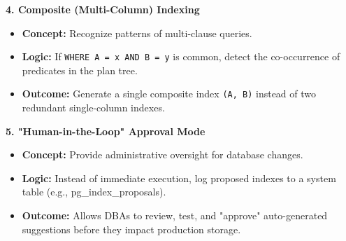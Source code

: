 \documentclass[12pt]{article}
\begin{document}
\noindent\textbf{4. Composite (Multi-Column) Indexing}

\begin{itemize}
    \item \textbf{Concept:} Recognize patterns of multi-clause queries.

    \item \textbf{Logic:} If \texttt{WHERE A = x AND B = y} is common, detect the co-occurrence of predicates in the plan tree.

    \item \textbf{Outcome:} Generate a single composite index \texttt{(A, B)} instead of two redundant single-column indexes.
\end{itemize}

\noindent\textbf{5. "Human-in-the-Loop" Approval Mode}

\begin{itemize}
    \item \textbf{Concept:} Provide administrative oversight for database changes.

    \item \textbf{Logic:} Instead of immediate execution, log proposed indexes to a system table (e.g., pg\_index\_proposals).

    \item \textbf{Outcome:} Allows DBAs to review, test, and "approve" auto-generated suggestions before they impact production storage.
\end{itemize}
\end{document}
